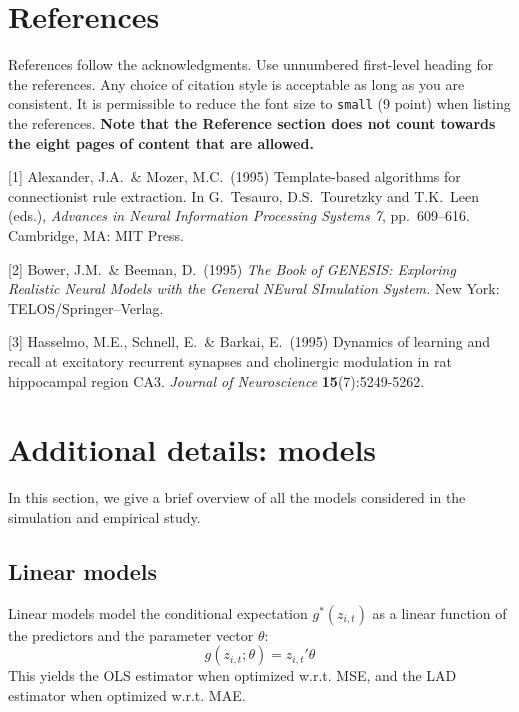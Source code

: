 \documentclass{article}
\begin{document}
\section*{References}

References follow the acknowledgments. Use unnumbered first-level heading for
the references. Any choice of citation style is acceptable as long as you are
consistent. It is permissible to reduce the font size to \verb+small+ (9 point)
when listing the references.
{\bf Note that the Reference section does not count towards the eight pages of content that are allowed.}
\medskip

\small

[1] Alexander, J.A.\ \& Mozer, M.C.\ (1995) Template-based algorithms for
connectionist rule extraction. In G.\ Tesauro, D.S.\ Touretzky and T.K.\ Leen
(eds.), {\it Advances in Neural Information Processing Systems 7},
pp.\ 609--616. Cambridge, MA: MIT Press.

[2] Bower, J.M.\ \& Beeman, D.\ (1995) {\it The Book of GENESIS: Exploring
  Realistic Neural Models with the General NEural SImulation System.}  New York:
TELOS/Springer--Verlag.

[3] Hasselmo, M.E., Schnell, E.\ \& Barkai, E.\ (1995) Dynamics of learning and
recall at excitatory recurrent synapses and cholinergic modulation in rat
hippocampal region CA3. {\it Journal of Neuroscience} {\bf 15}(7):5249-5262.


\appendix

\newpage

\section{Additional details: models}
In this section, we give a brief overview of all the models considered in the simulation and empirical study.

\subsection{Linear models}
Linear models model the conditional expectation \( g^*(z_{i, t}) \) as a linear function of the predictors and the parameter vector \( \theta \):
\begin{equation}
g(z_{i, t};\theta) = z_{i, t}' \theta
\end{equation}
This yields the OLS estimator when optimized w.r.t. MSE, and the LAD estimator when optimized w.r.t. MAE.
\end{document}
